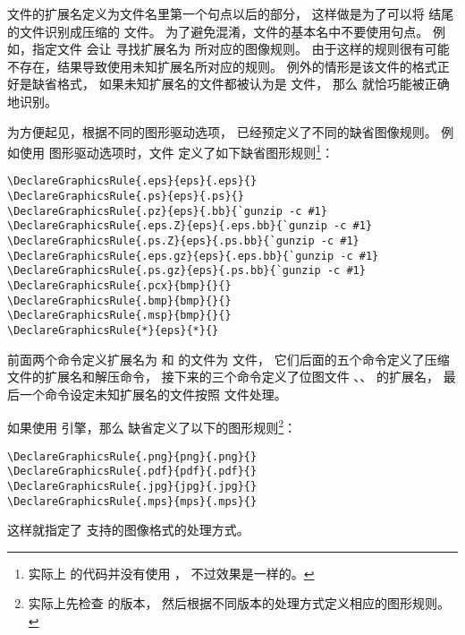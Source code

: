 文件的扩展名定义为文件名里第一个句点以后的部分，
这样做是为了可以将  结尾的文件识别成压缩的 文件。
为了避免混淆，文件的基本名中不要使用句点。
例如，指定文件  会让  寻找扩展名为  所对应的图像规则。
由于这样的规则很有可能不存在，结果导致使用未知扩展名所对应的规则。
例外的情形是该文件的格式正好是缺省格式，
如果未知扩展名的文件都被认为是  文件，
那么  就恰巧能被正确地识别。

为方便起见，根据不同的图形驱动选项，
已经预定义了不同的缺省图像规则。
例如使用  图形驱动选项时，文件  定义了如下缺省图形规则\footnote{
	实际上  的代码并没有使用 ，
	不过效果是一样的。}：
\begin{lstlisting}
\DeclareGraphicsRule{.eps}{eps}{.eps}{}
\DeclareGraphicsRule{.ps}{eps}{.ps}{}
\DeclareGraphicsRule{.pz}{eps}{.bb}{`gunzip -c #1}
\DeclareGraphicsRule{.eps.Z}{eps}{.eps.bb}{`gunzip -c #1}
\DeclareGraphicsRule{.ps.Z}{eps}{.ps.bb}{`gunzip -c #1}
\DeclareGraphicsRule{.eps.gz}{eps}{.eps.bb}{`gunzip -c #1}
\DeclareGraphicsRule{.ps.gz}{eps}{.ps.bb}{`gunzip -c #1}
\DeclareGraphicsRule{.pcx}{bmp}{}{}
\DeclareGraphicsRule{.bmp}{bmp}{}{}
\DeclareGraphicsRule{.msp}{bmp}{}{}
\DeclareGraphicsRule{*}{eps}{*}{}
\end{lstlisting}
前面两个命令定义扩展名为  和  的文件为  文件，
它们后面的五个命令定义了压缩  文件的扩展名和解压命令，
接下来的三个命令定义了位图文件 、、 的扩展名，
最后一个命令设定未知扩展名的文件按照  文件处理。

如果使用 \pdfTeX 引擎，那么  缺省定义了以下的图形规则\footnote{
	 实际上先检查 \pdfTeX{} 的版本，
	然后根据不同版本的处理方式定义相应的图形规则。}：
\begin{lstlisting}
\DeclareGraphicsRule{.png}{png}{.png}{}
\DeclareGraphicsRule{.pdf}{pdf}{.pdf}{}
\DeclareGraphicsRule{.jpg}{jpg}{.jpg}{}
\DeclareGraphicsRule{.mps}{mps}{.mps}{}
\end{lstlisting}
这样就指定了 \pdfTeX{} 支持的图像格式的处理方式。

\clearpage
\endinput

